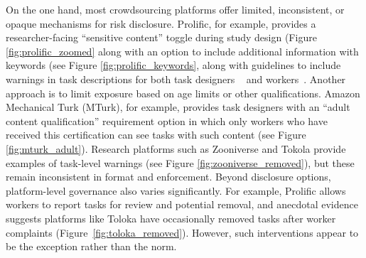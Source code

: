 On the one hand, most crowdsourcing platforms offer limited, inconsistent, or opaque mechanisms for risk disclosure. %
Prolific, for example, provides a researcher-facing ``sensitive content'' toggle during study design (Figure \ref{fig:prolific_zoomed} along with an option to include additional information with keywords (see Figure \ref{fig:prolific_keywords}, along with guidelines to include warnings in task descriptions for both task designers ~\cite{ProlificResearcherSensitive2025, ProlificAPIContentWarning2025} and workers~\cite{prolific2025participant}. Another approach is to limit exposure based on age limits or other qualifications. Amazon Mechanical Turk (MTurk), for example, provides task designers with an ``adult content qualification'' requirement option in which only workers who have received this certification can see tasks with such content (see Figure \ref{fig:mturk_adult}). Research platforms such as Zooniverse and Tokola provide examples of task-level warnings (see Figure \ref{fig:zooniverse_removed}), but these remain inconsistent in format and enforcement.
Beyond disclosure options, platform-level governance also varies significantly. %
For example, Prolific allows workers to report tasks for review and potential removal, and anecdotal evidence suggests platforms like Toloka have occasionally removed tasks after worker complaints (Figure~\ref{fig:toloka_removed}). However, such interventions appear to be the exception rather than the norm.

